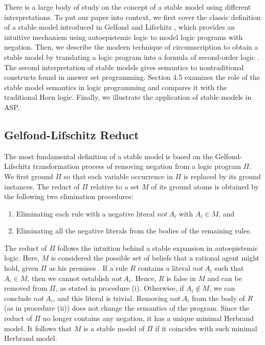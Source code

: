 There is a large body 
of study on the concept of a stable model using different interpretations. To put our paper into 
context, we first cover the classic definition of a stable model introduced in Gelfond and Lifschitz 
\cite{gelfond}, 
which provides an intuitive mechanism using autoepistemic logic to model logic programs with negation. 
Then, we describe the modern  
technique of circumscription to obtain a stable model by translating a logic program 
into a formula of second-order logic \cite{lee}. The second interpretation of stable models gives semantics 
to nontraditional constructs found in answer set programming. Section 4.5 examines the role of 
the stable model semantics in logic programming and compares it with the traditional Horn logic. Finally, 
we illustrate the application of stable models in ASP. 

\subsection{Gelfond-Lifschitz Reduct}
The most fundamental definition of a stable model is based on the Gelfond-Lifschitz transformation 
process \cite{gelfond} of removing negation from a logic program $\Pi$. 
We first ground $\Pi$ so that each variable occurrence in $\Pi$ is replaced by its ground instances. 
The reduct of $\Pi$ relative to a set $M$ of its ground atoms is obtained by the following two 
elimination procedures:
\begin{enumerate}[label=(\roman*)]
    \item Eliminating each rule with a negative literal $not \: A_i$ with $A_i \in M$, and 
    \item Eliminating all the negative literals from the bodies of the remaining rules.
\end{enumerate}
The reduct of $\Pi$ follows the intuition behind a stable expansion in 
autoepistemic logic. Here, $M$ is considered the possible set of beliefs that a rational 
agent might hold, given $\Pi$ as his premises \cite{gelfond}. If a rule $R$ contains a literal $not \: A_i$ 
such that $A_i \in M$, then we cannot establish $not \: A_i$. Hence, $R$ is false in $M$ and can be 
removed from $\Pi$, as stated in procedure (i). Otherwise, if $A_i \not \in M$, we can conclude 
$not \: A_i$, and this literal is trivial. Removing $not \: A_i$ from the body of $R$ (as in procedure (ii)) 
does not change the semantics of the program. Since the reduct of $\Pi$ no longer 
contains any negation, it has a unique minimal Herbrand model.  
It follows that $M$ is a stable model of $\Pi$ if it coincides with such minimal Herbrand model.

